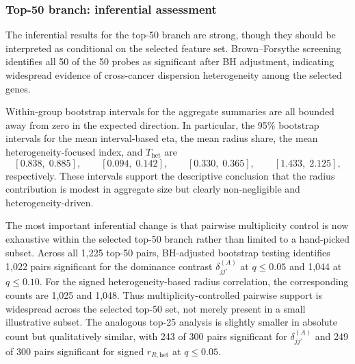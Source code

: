 \documentclass[preprint, times, 12pt, authoryear]{elsarticle}
\begin{document}
\subsubsection{Top-50 branch: inferential assessment}

The inferential results for the top-50 branch are strong, though they should be interpreted as conditional on the selected feature set. Brown--Forsythe screening identifies all 50 of the 50 probes as significant after BH adjustment, indicating widespread evidence of cross-cancer dispersion heterogeneity among the selected genes.

Within-group bootstrap intervals for the aggregate summaries are all bounded away from zero in the expected direction. In particular, the 95\% bootstrap intervals for the mean interval-based eta, the mean radius share, the mean heterogeneity-focused index, and \(T_{\mathrm{het}}\) are
\[
[0.838,\;0.885],\qquad
[0.094,\;0.142],\qquad
[0.330,\;0.365],\qquad
[1.433,\;2.125],
\]
respectively. These intervals support the descriptive conclusion that the radius contribution is modest in aggregate size but clearly non-negligible and heterogeneity-driven.

The most important inferential change is that pairwise multiplicity control is now exhaustive within the selected top-50 branch rather than limited to a hand-picked subset. Across all 1,225 top-50 pairs, BH-adjusted bootstrap testing identifies 1,022 pairs significant for the dominance contrast \(\delta_{jj'}^{(A)}\) at \(q\le 0.05\) and 1,044 at \(q\le 0.10\). For the signed heterogeneity-based radius correlation, the corresponding counts are 1,025 and 1,048. Thus multiplicity-controlled pairwise support is widespread across the selected top-50 set, not merely present in a small illustrative subset. The analogous top-25 analysis is slightly smaller in absolute count but qualitatively similar, with 243 of 300 pairs significant for \(\delta_{jj'}^{(A)}\) and 249 of 300 pairs significant for signed \(r_{R,\mathrm{het}}\) at \(q\le 0.05\).
\end{document}
